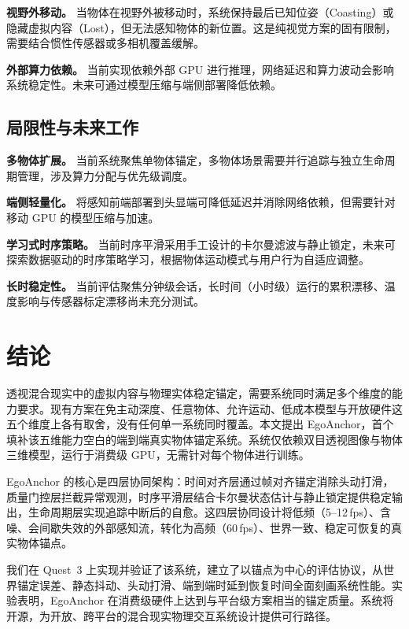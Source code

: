 \documentclass[review]{vgtc}
\begin{document}
\noindent\textbf{视野外移动。} 当物体在视野外被移动时，系统保持最后已知位姿（Coasting）或隐藏虚拟内容（Lost），但无法感知物体的新位置。这是纯视觉方案的固有限制，需要结合惯性传感器或多相机覆盖缓解。

\noindent\textbf{外部算力依赖。} 当前实现依赖外部 GPU 进行推理，网络延迟和算力波动会影响系统稳定性。未来可通过模型压缩与端侧部署降低依赖。

\subsection{局限性与未来工作}

\noindent\textbf{多物体扩展。} 当前系统聚焦单物体锚定，多物体场景需要并行追踪与独立生命周期管理，涉及算力分配与优先级调度。

\noindent\textbf{端侧轻量化。} 将感知前端部署到头显端可降低延迟并消除网络依赖，但需要针对移动 GPU 的模型压缩与加速。

\noindent\textbf{学习式时序策略。} 当前时序平滑采用手工设计的卡尔曼滤波与静止锁定，未来可探索数据驱动的时序策略学习，根据物体运动模式与用户行为自适应调整。

\noindent\textbf{长时稳定性。} 当前评估聚焦分钟级会话，长时间（小时级）运行的累积漂移、温度影响与传感器标定漂移尚未充分测试。

\section{结论}

透视混合现实中的虚拟内容与物理实体稳定锚定，需要系统同时满足多个维度的能力要求。现有方案在免主动深度、任意物体、允许运动、低成本模型与开放硬件这五个维度上各有取舍，没有任何单一系统同时覆盖。本文提出 EgoAnchor，首个填补该五维能力空白的端到端真实物体锚定系统。系统仅依赖双目透视图像与物体三维模型，运行于消费级 GPU，无需针对每个物体进行训练。

EgoAnchor 的核心是四层协同架构：时间对齐层通过帧对齐锚定消除头动打滑，质量门控层拦截异常观测，时序平滑层结合卡尔曼状态估计与静止锁定提供稳定输出，生命周期层实现追踪中断后的自愈。这四层协同设计将低频（5--12\,fps）、含噪、会间歇失效的外部感知流，转化为高频（60\,fps）、世界一致、稳定可恢复的真实物体锚点。

我们在 Quest~3 上实现并验证了该系统，建立了以锚点为中心的评估协议，从世界锚定误差、静态抖动、头动打滑、端到端时延到恢复时间全面刻画系统性能。实验表明，EgoAnchor 在消费级硬件上达到与平台级方案相当的锚定质量。系统将开源，为开放、跨平台的混合现实物理交互系统设计提供可行路径。

\nocite{*}


\end{document}
